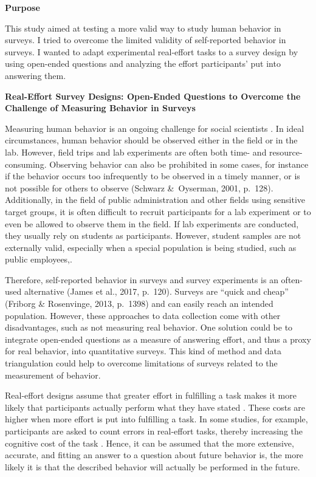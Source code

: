 \documentclass{article}
\begin{document}
\textbf{Purpose}

This study aimed at testing a more valid way to study human behavior in surveys. I tried to overcome the limited validity of self-reported behavior in surveys. I wanted to adapt experimental real-effort tasks to a survey design by using open-ended questions and analyzing the effort participants' put into answering them.

\textbf{}

\textbf{Real-Effort Survey Designs: Open-Ended Questions to Overcome the Challenge of Measuring Behavior in Surveys}

Measuring human behavior is an ongoing challenge for social scientists \parencite{Schwarz2001}. In ideal circumstances, human behavior should be observed either in the field or in the lab. However, field trips and lab experiments are often both time- and resource-consuming. Observing behavior can also be prohibited in some cases, for instance if the behavior occurs too infrequently to be observed in a timely manner, or is not possible for others to observe (Schwarz \& Oyserman, 2001, p. 128). Additionally, in the field of public administration and other fields using sensitive target groups, it is often difficult to recruit participants for a lab experiment or to even be allowed to observe them in the field. If lab experiments are conducted, they usually rely on students as participants. However, student samples are not externally valid, especially when a special population is being studied, such as public employees,. 

Therefore, self-reported behavior in surveys and survey experiments is an often-used alternative (James et al., 2017, p. 120). Surveys are “quick and cheap” (Friborg \& Rosenvinge, 2013, p. 1398) and can easily reach an intended population. However, these approaches to data collection come with other disadvantages, such as not measuring real behavior. One solution could be to integrate open-ended questions as a measure of answering effort, and thus a proxy for real behavior, into quantitative surveys. This kind of method and data triangulation could help to overcome limitations of surveys related to the measurement of behavior. 

Real-effort designs assume that greater effort in fulfilling a task makes it more likely that participants actually perform what they have stated \parencite{Dutcher2015, Charness2018}. These costs are higher when more effort is put into fulfilling a task. In some studies, for example, participants are asked to count errors in real-effort tasks, thereby increasing the cognitive cost of the task \parencite{Andersen2018, Gneezy2006}. Hence, it can be assumed that the more extensive, accurate, and fitting an answer to a question about future behavior is, the more likely it is that the described behavior will actually be performed in the future. 
\end{document}
